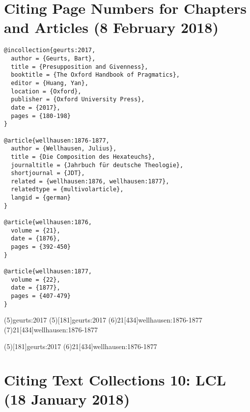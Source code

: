 \documentclass[a4paper]{article}
\begin{document}
\section{Citing Page Numbers for Chapters and Articles (8 February 2018)}

\begin{verbatim}
@incollection{geurts:2017,
  author = {Geurts, Bart},
  title = {Presupposition and Givenness},
  booktitle = {The Oxford Handbook of Pragmatics},
  editor = {Huang, Yan},
  location = {Oxford},
  publisher = {Oxford University Press},
  date = {2017},
  pages = {180-198}
}

@article{wellhausen:1876-1877,
  author = {Wellhausen, Julius},
  title = {Die Composition des Hexateuchs},
  journaltitle = {Jahrbuch für deutsche Theologie},
  shortjournal = {JDT},
  related = {wellhausen:1876, wellhausen:1877},
  relatedtype = {multivolarticle},
  langid = {german}
}

@article{wellhausen:1876,
  volume = {21},
  date = {1876},
  pages = {392-450}
}

@article{wellhausen:1877,
  volume = {22},
  date = {1877},
  pages = {407-479}
}
\end{verbatim}

\examplecite(5){geurts:2017}
\citereset
\examplecite(5)[181]{geurts:2017}
\examplevolcite(6){21}[434]{wellhausen:1876-1877}
\examplevolcite(7){21}[434]{wellhausen:1876-1877}
\exampleabbreviations
\examplebibliography
\citereset
\begin{verbtext}
  \usepackage[style=sbl,citepages=separate]{biblatex}
\end{verbtext}
\makeatletter
{\cbx@opt@citepages@separate
 \examplecite(5)[181]{geurts:2017}
 \examplevolcite(6){21}[434]{wellhausen:1876-1877}
}
\makeatother
{}

\section{Citing Text Collections 10: LCL (18 January 2018)}
\end{document}
